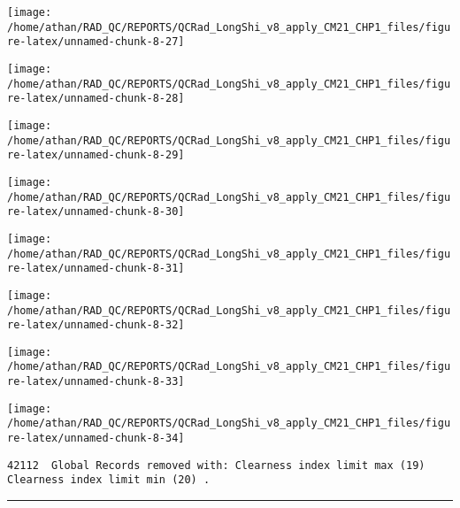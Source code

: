 \documentclass[
  10pt,
  a4paper,oneside]{article}
\begin{document}
\begin{center}\texttt{[image: /home/athan/RAD\_QC/REPORTS/QCRad\_LongShi\_v8\_apply\_CM21\_CHP1\_files/figure-latex/unnamed-chunk-8-27]} \end{center}

\begin{center}\texttt{[image: /home/athan/RAD\_QC/REPORTS/QCRad\_LongShi\_v8\_apply\_CM21\_CHP1\_files/figure-latex/unnamed-chunk-8-28]} \end{center}

\begin{center}\texttt{[image: /home/athan/RAD\_QC/REPORTS/QCRad\_LongShi\_v8\_apply\_CM21\_CHP1\_files/figure-latex/unnamed-chunk-8-29]} \end{center}

\begin{center}\texttt{[image: /home/athan/RAD\_QC/REPORTS/QCRad\_LongShi\_v8\_apply\_CM21\_CHP1\_files/figure-latex/unnamed-chunk-8-30]} \end{center}

\begin{center}\texttt{[image: /home/athan/RAD\_QC/REPORTS/QCRad\_LongShi\_v8\_apply\_CM21\_CHP1\_files/figure-latex/unnamed-chunk-8-31]} \end{center}

\begin{center}\texttt{[image: /home/athan/RAD\_QC/REPORTS/QCRad\_LongShi\_v8\_apply\_CM21\_CHP1\_files/figure-latex/unnamed-chunk-8-32]} \end{center}

\begin{center}\texttt{[image: /home/athan/RAD\_QC/REPORTS/QCRad\_LongShi\_v8\_apply\_CM21\_CHP1\_files/figure-latex/unnamed-chunk-8-33]} \end{center}

\begin{center}\texttt{[image: /home/athan/RAD\_QC/REPORTS/QCRad\_LongShi\_v8\_apply\_CM21\_CHP1\_files/figure-latex/unnamed-chunk-8-34]} \end{center}

\begin{verbatim}
42112  Global Records removed with: Clearness index limit max (19) Clearness index limit min (20) .
\end{verbatim}

\begin{center}\rule{0.5\linewidth}{0.5pt}\end{center}
\end{document}
